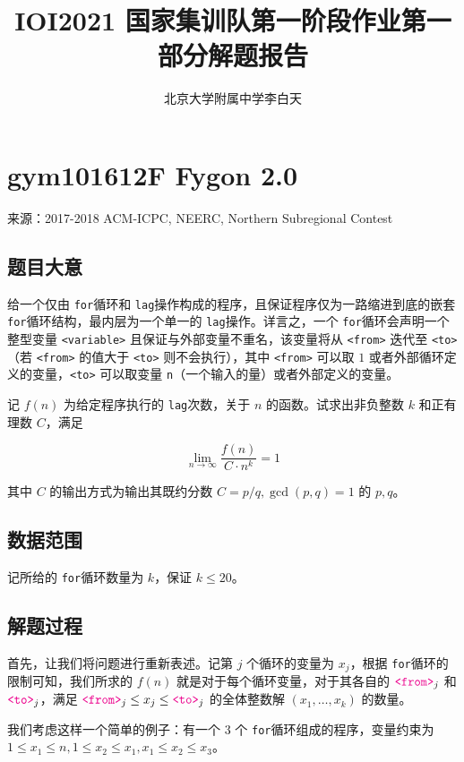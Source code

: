 \documentclass[12pt]{ctexart}
\title{IOI2021 国家集训队第一阶段作业第一部分解题报告}
\author{北京大学附属中学\quad 李白天}
\begin{document}
\maketitle

\section{gym101612F Fygon 2.0}

来源：2017-2018 ACM-ICPC, NEERC, Northern Subregional Contest

\subsection{题目大意}

\newcommand{\for}{\texttt{for}}
\newcommand{\lag}{\texttt{lag}}
\providecommand*{\var}[1]{{\color{magenta}\texttt{<#1>}}}

给一个仅由 \for 循环和 \lag 操作构成的程序，且保证程序仅为一路缩进到底的嵌套 \for 循环结构，最内层为一个单一的 \lag 操作。详言之，一个 \for 循环会声明一个整型变量 \var{variable} 且保证与外部变量不重名，该变量将从 \var{from} 迭代至 \var{to}（若 \var{from} 的值大于 \var{to} 则不会执行），其中 \var{from} 可以取 $1$ 或者外部循环定义的变量，\var{to} 可以取变量 \texttt{n}（一个输入的量）或者外部定义的变量。

记 $f(n)$ 为给定程序执行的 \lag 次数，关于 $n$ 的函数。试求出非负整数 $k$ 和正有理数 $C$，满足

$$
\lim_{n\rightarrow \infty} \frac{f(n)}{C\cdot n^k} = 1
$$

其中 $C$ 的输出方式为输出其既约分数 $C=p/q, \gcd(p,q)=1$ 的 $p,q$。

\subsection{数据范围}

记所给的 \for 循环数量为 $k$，保证 $k\le 20$。

\subsection{解题过程}

首先，让我们将问题进行重新表述。记第 $j$ 个循环的变量为 $x_j$，根据 \for 循环的限制可知，我们所求的 $f(n)$ 就是对于每个循环变量，对于其各自的 $\var{from}_j$ 和 $\var{to}_j$，满足 $\var{from}_j \le x_j \le \var{to}_j$ 的全体整数解 $(x_1, \dots, x_k)$ 的数量。

我们考虑这样一个简单的例子：有一个 $3$ 个 \for 循环组成的程序，变量约束为 $1\le x_1\le n, 1\le x_2\le x_1, x_1 \le x_2\le x_3$。

\newpage
\end{document}
